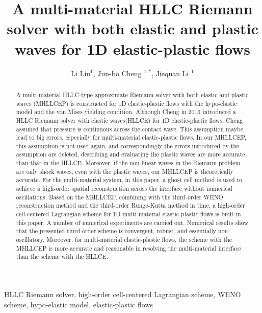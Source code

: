\documentclass[review]{elsarticle}
\begin{document}
\title{A multi-material HLLC Riemann solver with both elastic and plastic waves for 1D  elastic-plastic flows}
\author{Li Liu$^1$, Jun-bo Cheng $^{1,*}$, Jiequan Li $^{1}$}

\maketitle

\address{$^1$  Institute of Applied Physics and Computational Mathematics, Beijing 100094, China }

\begin{abstract}
  A multi-material HLLC-type  approximate Riemann solver with both elastic and plastic waves (MHLLCEP) is constructed for 1D elastic-plastic flows with the  hypo-elastic model and the von Mises yielding condition. Although Cheng in 2016 introduced a HLLC Riemann solver with elastic waves(HLLCE) for 1D elastic-plastic flows, Cheng assumed that pressure is continuous across the contact wave. This assumption maybe lead to big errors, especially for multi-material elastic-plastic flows. In our MHLLCEP, this assumption is not used again, and correspondingly the errors introduced by the assumption are deleted, describing and evaluating the plastic waves are more accurate than that in the HLLCE. Moreover, if the non-linear waves in the Riemann problem are only shock waves, even with the plastic waves, our MHLLCEP is theoretically accurate. For  the multi-material system, in this paper, a ghost cell method is used to achieve a high-order spatial reconstruction across the interface without numerical oscillations. Based on the MHLLCEP, combining with the third-order WENO reconstruction method and the third-order Runge-Kutta method in time, a high-order cell-centered Lagrangian scheme for 1D multi-material elastic-plastic flows is built in this paper. A number of numerical experiments are carried out. Numerical results show  that the presented third-order scheme is convergent, robust, and essentially non-oscillatory. Moreover, for multi-material elastic-plastic flows, the scheme with  the MHLLCEP is more accurate and reasonable in resolving the multi-material interface than the scheme with the  HLLCE.
\end{abstract}

\begin{keyword}
  HLLC Riemann solver, high-order cell-centered Lagrangian scheme,  WENO scheme,  hypo-elastic model, elastic-plastic flows
\end{keyword}
\end{document}
